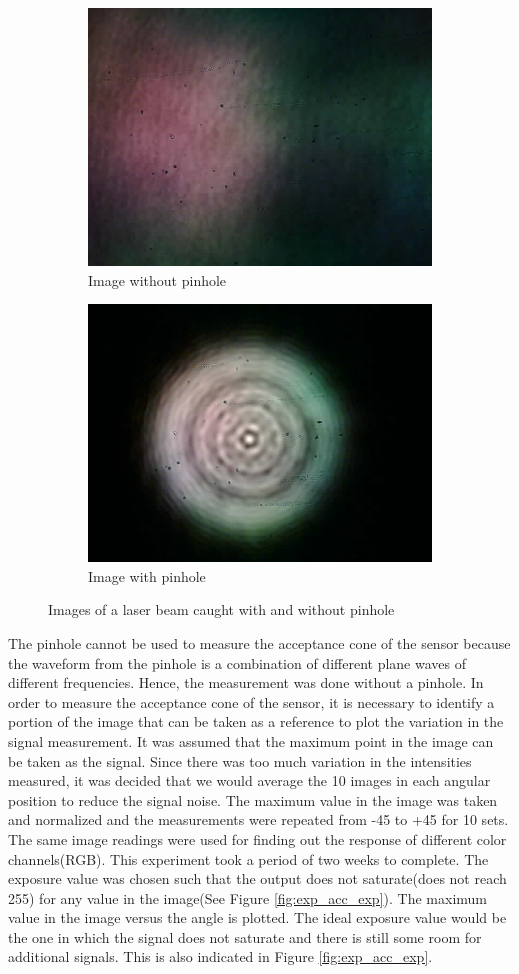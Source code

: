 \begin{figure}[ht]
    \centering
    \begin{subfigure}{0.5\textwidth}
    \centering
        \includegraphics[width=0.5\linewidth]{pics/withoutPinhole.jpg}
        \caption{Image without pinhole}
        \label{fig:nopinhole}
    \end{subfigure}%
    \begin{subfigure}{0.5\textwidth}
    \centering
        \includegraphics[width=0.5\linewidth]{pics/withPinhole.jpg}
        \caption{Image with pinhole}
        \label{fig:pinhole}
    \end{subfigure}
    \caption{Images of a laser beam caught with and without pinhole}
    \label{fig:pinholeDiff}
    \end{figure}
The pinhole cannot be used to measure the acceptance cone of the sensor because the waveform from the pinhole is a combination of different plane waves of different frequencies. Hence, the measurement was done without a pinhole. In order to measure the acceptance cone of the sensor, it is necessary to identify a portion of the image that can be taken as a reference to plot the variation in the signal measurement. It was assumed that the maximum point in the image can be taken as the signal. Since there was too much variation in the intensities measured, it was decided that we would average the 10 images in each angular position to reduce the signal noise. The maximum value in the image was taken and normalized and the measurements were repeated from -45 to +45 for 10 sets. The same image readings were used for finding out the response of different color channels(RGB). This experiment took a period of two weeks to complete. The exposure value was chosen such that the output does not saturate(does not reach 255) for any value in the image(See Figure \ref{fig:exp_acc_exp}). The maximum value in the image versus the angle is plotted. The ideal exposure value would be the one in which the signal does not saturate and there is still some room for additional signals. This is also indicated in Figure \ref{fig:exp_acc_exp}.
